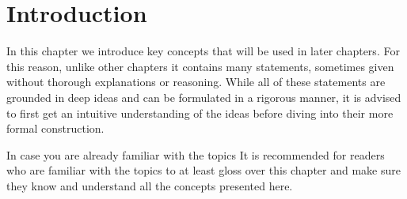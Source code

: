 
\chapter{Introduction}\label{chapter:intro}
In this chapter we introduce key concepts that will be used in later chapters. For this reason, unlike other chapters it contains many statements, sometimes given without thorough explanations or reasoning. While all of these statements are grounded in deep ideas and can be formulated in a rigorous manner, it is advised to first get an intuitive understanding of the ideas before diving into their more formal construction.

\vspace{2em}
\begin{note}{In case you are already familiar with the topics}{}
	It is recommended for readers who are familiar with the topics to at least gloss over this chapter and make sure they know and understand all the concepts presented here.
\end{note}
